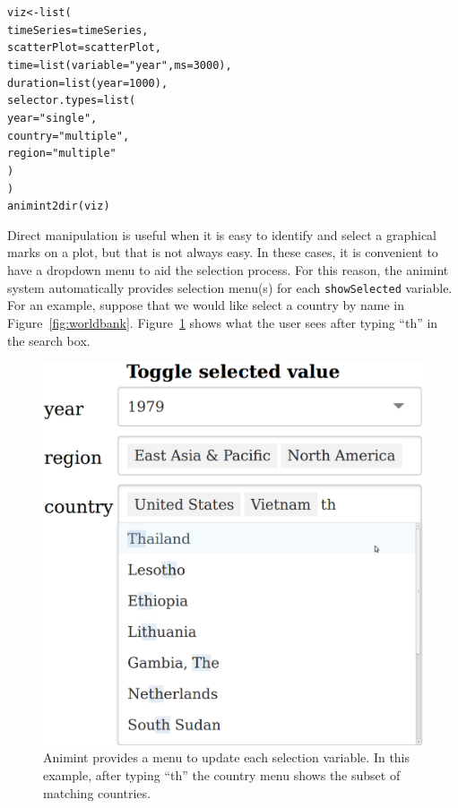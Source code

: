 \documentclass[journal]{vgtc}\usepackage[]{graphicx}\usepackage[]{color}
\makeatletter
\newcommand{\hlnum}[1]{\textcolor[rgb]{0,0,0}{#1}}%
\newcommand{\hlstr}[1]{\textcolor[rgb]{0.502,0,0}{#1}}%
\newcommand{\hlstd}[1]{\textcolor[rgb]{0,0,0}{#1}}%
\newcommand{\hlkwb}[1]{\textcolor[rgb]{0,0,0}{#1}}%
\newcommand{\hlkwc}[1]{\textcolor[rgb]{0,0,1}{#1}}%
\newcommand{\hlkwd}[1]{\textcolor[rgb]{0,0,0}{#1}}%
\newenvironment{kframe}{%
 \def\at@end@of@kframe{}%
 \ifinner\ifhmode%
  \def\at@end@of@kframe{\end{minipage}}%
  \begin{minipage}{\columnwidth}%
 \fi\fi%
 \def\FrameCommand##1{\hskip\@totalleftmargin \hskip-\fboxsep
 \colorbox{shadecolor}{##1}\hskip-\fboxsep
     \hskip-\linewidth \hskip-\@totalleftmargin \hskip\columnwidth}%
 \MakeFramed {\advance\hsize-\width
   \@totalleftmargin\z@ \linewidth\hsize
   \@setminipage}}%
 {\par\unskip\endMakeFramed%
 \at@end@of@kframe}
\newenvironment{knitrout}{}{} %
\makeatother
\begin{document}
\begin{knitrout}
\color{fgcolor}\begin{kframe}
\begin{alltt}
\hlstd{viz} \hlkwb{<-} \hlkwd{list}\hlstd{(}
  \hlkwc{timeSeries} \hlstd{= timeSeries,}
  \hlkwc{scatterPlot} \hlstd{= scatterPlot,}
  \hlkwc{time} \hlstd{=} \hlkwd{list}\hlstd{(}\hlkwc{variable} \hlstd{=} \hlstr{"year"}\hlstd{,} \hlkwc{ms} \hlstd{=} \hlnum{3000}\hlstd{),}
  \hlkwc{duration} \hlstd{=} \hlkwd{list}\hlstd{(}\hlkwc{year} \hlstd{=} \hlnum{1000}\hlstd{),}
  \hlkwc{selector.types} \hlstd{=} \hlkwd{list}\hlstd{(}
    \hlkwc{year} \hlstd{=} \hlstr{"single"}\hlstd{,}
    \hlkwc{country} \hlstd{=} \hlstr{"multiple"}\hlstd{,}
    \hlkwc{region} \hlstd{=} \hlstr{"multiple"}
  \hlstd{)}
\hlstd{)}
\hlkwd{animint2dir}\hlstd{(viz)}
\end{alltt}
\end{kframe}
\end{knitrout}


Direct manipulation is useful when it is easy to identify and select 
a graphical marks on a plot, but that is not always easy. In these cases,
it is convenient to have a dropdown menu to aid the selection process.
For this reason, the animint system automatically provides selection 
menu(s) for each \texttt{showSelected} variable. 
For an example, suppose that we would like select a country by name in
Figure~\ref{fig:worldbank}. Figure~\ref{fig:widgets} shows what the user
sees after typing ``th'' in the search box. 

\begin{figure}[htp]
  \centering
  \includegraphics[width=0.5\columnwidth]{Screenshot-toggle-selected-value}
  \caption{Animint provides a menu to update each selection
    variable. In this example, after typing ``th'' the country menu
    shows the subset of matching countries.}
  \label{fig:widgets}
\end{figure}
\end{document}

